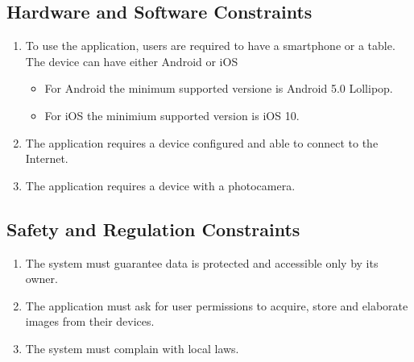 \subsection{Hardware  and Software Constraints}
\begin{enumerate}
    \item To use the application, users are required to have a smartphone or a table. The device can have either Android or iOS 
        \begin{itemize}
            \item For Android the minimum supported versione is Android 5.0 Lollipop.
            \item For iOS the minimium supported version is iOS 10.
        \end{itemize}
    \item The application requires a device configured and able to connect to the Internet.
    \item The application requires a device with a photocamera.
\end{enumerate}

\subsection{Safety and Regulation Constraints}
\begin{enumerate}
    \item The system must guarantee data is protected and accessible only by its owner.
    \item The application must ask for user permissions to acquire, store and elaborate images from their devices.
    \item The system must complain with local laws.  
\end{enumerate}


